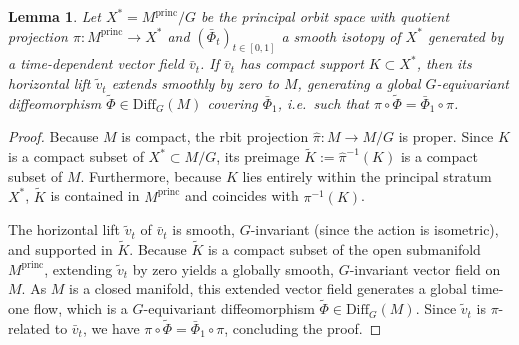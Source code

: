 \documentclass[12pt,a4paper]{amsart}
\theoremstyle{plain}
\newtheorem{lemma}[theorem]{Lemma}
\theoremstyle{definition}
\theoremstyle{remark}
\begin{document}
\begin{lemma}\label{lem:compactlift}
Let $X^* = M^{\mathrm{princ}}/G$ be the principal orbit space with quotient projection
$\pi\colon M^{\mathrm{princ}} \to X^*$ and $(\bar{\Phi}_t)_{t \in [0,1]}$ a smooth isotopy of $X^*$
generated by a time-dependent vector field $\bar{v}_t$. If $\bar{v}_t$ has compact support
$K \subset X^*$, then its horizontal lift $\widetilde{v}_t$ extends smoothly by zero to $M$,
generating a global $G$-equivariant diffeomorphism $\widetilde{\Phi} \in \mathrm{Diff}_G(M)$
covering $\bar{\Phi}_1$, i.e.\ such that $\pi\circ \widetilde \Phi=\bar\Phi_1\circ \pi$.
\end{lemma}
\begin{proof}
Because $M$ is compact, the rbit projection $\widehat\pi: M \to M/G$ is proper. Since $K$ is a compact subset of $X^* \subset M/G$, its preimage $\widetilde{K} := \hat{\pi}^{-1}(K)$ is a compact subset of $M$. Furthermore, because $K$ lies entirely within the principal stratum $X^*$, $\widetilde{K}$ is contained in $M^{\mathrm{princ}}$ and coincides with $\pi^{-1}(K)$. 

The horizontal lift $\widetilde{v}_t$ of $\bar{v}_t$ is smooth, $G$-invariant (since the action is isometric), and supported in $\widetilde{K}$. Because $\widetilde{K}$ is a compact subset of the open submanifold $M^{\mathrm{princ}}$, extending $\widetilde{v}_t$ by zero yields a globally smooth, $G$-invariant vector field on $M$. As $M$ is a closed manifold, this extended vector field generates a global time-one flow, which is a $G$-equivariant diffeomorphism $\widetilde{\Phi} \in \mathrm{Diff}_G(M)$. Since $\widetilde{v}_t$ is $\pi$-related to $\bar{v}_t$, we have $\pi \circ \widetilde{\Phi} = \bar{\Phi}_1 \circ \pi$, concluding the proof.
\end{proof}
\end{document}
